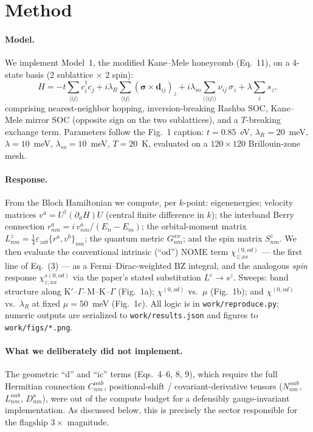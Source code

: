 \documentclass[11pt]{article}
\newcommand{\lamR}{\lambda_{R}}
\begin{document}
\section{Method}
\paragraph{Model.} We implement Model~1, the modified Kane--Mele
honeycomb (Eq.~11), on a 4-state basis (2 sublattice $\times$ 2 spin):
\[
H = -t\sum_{\langle ij\rangle} c^\dagger_i c_j
   + i\lamR \sum_{\langle ij\rangle} (\boldsymbol{\sigma}\times \mathbf{d}_{ij})_z
   + i\lambda_{so}\sum_{\langle\langle ij\rangle\rangle} \nu_{ij}\,\sigma_z
   + \lambda \sum_i s_z ,
\]
comprising nearest-neighbor hopping, inversion-breaking Rashba SOC,
Kane--Mele mirror SOC (opposite sign on the two sublattices), and a
$T$-breaking exchange term. Parameters follow the Fig.~1 caption:
$t = 0.85$~eV, $\lamR = 20$~meV, $\lambda = 10$~meV,
$\lambda_{so} = 10$~meV, $T = 20$~K, evaluated on a $120\times120$
Brillouin-zone mesh.

\paragraph{Response.} From the Bloch Hamiltonian we compute, per
$k$-point: eigenenergies; velocity matrices $v^a = U^\dagger(\partial_a H)U$
(central finite difference in $k$); the interband Berry connection
$r^a_{nm} = i\,v^a_{nm}/(E_n - E_m)$; the orbital-moment matrix
$L^z_{nm} = \tfrac14\varepsilon_{zab}\{r^a,v^b\}_{nm}$; the quantum metric
$G^{xx}_{nm}$; and the spin matrix $S^z_{nm}$. We then evaluate the
conventional intrinsic (``od'') NOME term $\chi^{(0,od)}_{z;xx}$ --- the
first line of Eq.~(3) --- as a Fermi--Dirac-weighted BZ integral, and the
analogous \emph{spin} response $\chi^{s(0,od)}_{z;xx}$ via the paper's
stated substitution $L^c \to s^z$. Sweeps: band structure along
K$'$--$\Gamma$--M--K--$\Gamma$ (Fig.~1a); $\chi^{(0,od)}$ vs.\ $\mu$
(Fig.~1b); and $\chi^{(0,od)}$ vs.\ $\lamR$ at fixed $\mu=50$~meV
(Fig.~1c). All logic is in \texttt{work/reproduce.py}; numeric outputs are
serialized to \texttt{work/results.json} and figures to
\texttt{work/figs/*.png}.

\paragraph{What we deliberately did not implement.} The geometric ``d''
and ``ic'' terms (Eqs.~4--6, 8, 9), which require the full Hermitian
connection $C^{\alpha ab}_{nm}$, positional-shift / covariant-derivative
tensors ($N^{\alpha ab}_{nm}$, $L^{\alpha ab}_{nm}$, $D^a_{mn}$), were out
of the compute budget for a defensibly gauge-invariant implementation. As
discussed below, this is precisely the sector responsible for the flagship
$3\times$ magnitude.
\end{document}
